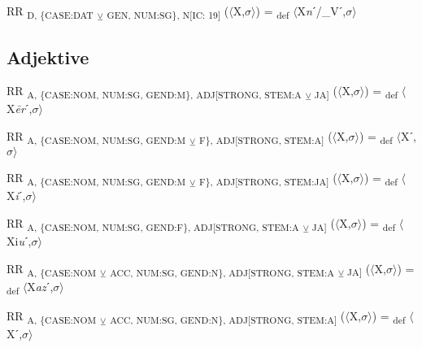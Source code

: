 {\begin{exe}
 RR \textsubscript{D, \{CASE:DAT} \textsubscript{${\veebar}$}\textsubscript{ GEN, NUM:SG\}, N[IC: 19]} ($\langle$X,$\sigma $$\rangle$) = \textsubscript{def} $\langle$X\textit{n}ˊ/\_Vˊ,$\sigma $$\rangle$
\end{exe}

\subsection{Adjektive}

\begin{exe}
 RR \textsubscript{A, \{CASE:NOM, NUM:SG, GEND:M\}, ADJ[STRONG, STEM:A} \textsubscript{${\veebar}$ JA}\textsubscript{]} ($\langle$X,$\sigma $$\rangle$) = \textsubscript{def} $\langle$X\textit{\=er}ˊ,$\sigma $$\rangle$
\end{exe}

\begin{exe}
 RR \textsubscript{A, \{CASE:NOM, NUM:SG, GEND:M} \textsubscript{${\veebar}$} \textsubscript{F\}, ADJ[STRONG, STEM:A]} ($\langle$X,$\sigma $$\rangle$) = \textsubscript{def} $\langle$Xˊ,$\sigma $$\rangle$
\end{exe}

\begin{exe}
 RR \textsubscript{A, \{CASE:NOM, NUM:SG, GEND:M} \textsubscript{${\veebar}$} \textsubscript{F\}, ADJ[STRONG, STEM:JA]} ($\langle$X,$\sigma $$\rangle$) = \textsubscript{def} $\langle$X\textit{i}ˊ,$\sigma $$\rangle$
\end{exe}

\begin{exe}
 RR \textsubscript{A, \{CASE:NOM, NUM:SG, GEND:F\}, ADJ[STRONG, STEM:A} \textsubscript{${\veebar}$ JA}\textsubscript{]} ($\langle$X,$\sigma $$\rangle$) = \textsubscript{def} $\langle$Xi\textit{u}ˊ,$\sigma $$\rangle$
\end{exe}

\begin{exe}
 RR \textsubscript{A, \{CASE:NOM} \textsubscript{${\veebar}$} \textsubscript{ACC, NUM:SG, GEND:N\}, ADJ[STRONG, STEM:A} \textsubscript{${\veebar}$ JA}\textsubscript{]} ($\langle$X,$\sigma $$\rangle$) = \textsubscript{def} $\langle$X\textit{az}ˊ,$\sigma $$\rangle$
\end{exe}

\begin{exe}
 RR \textsubscript{A, \{CASE:NOM} \textsubscript{${\veebar}$} \textsubscript{ACC, NUM:SG, GEND:N\}, ADJ[STRONG, STEM:A]} ($\langle$X,$\sigma $$\rangle$) = \textsubscript{def} $\langle$Xˊ,$\sigma $$\rangle$
\end{exe}

}
